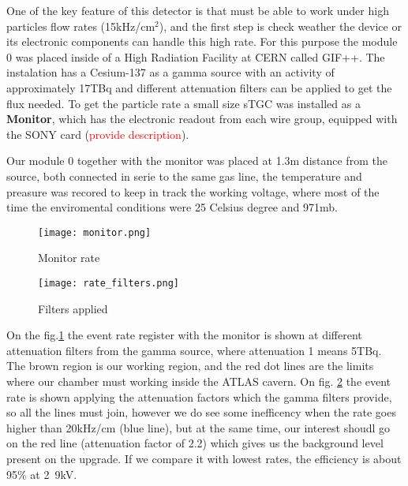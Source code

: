 One of the key feature of this detector is that must be able to work under high particles flow
rates (\unit{15}{kHz/cm$^2$}), and the first step is
check weather the device or its electronic components can handle this high rate. For this purpose the module 0 was
placed inside of a High Radiation Facility at CERN called GIF++.
The instalation has a Cesium-137 as a gamma source with an activity of approximately \unit{17}{TBq} and different attenuation
filters can be applied to get the flux needed. 
To get the particle rate a small size sTGC was installed as a {\bf Monitor}, which has the electronic readout from each
wire group, equipped with the SONY card (\textcolor{red}{provide description}).

Our module 0 together with the monitor was placed at 1.3m distance from the source, both connected in serie to the same
gas line, the temperature and preasure was recored to keep in track the working voltage, where most of the time the
enviromental conditions were 25 Celsius degree and \unit{971}{mb}.\\

\begin{figure}[!hb]
	\centering
	\texttt{[image: monitor.png]}
	\caption{Monitor rate}\label{fig:monrate}
\end{figure}


\begin{figure}[!ht]
	\centering
	\texttt{[image: rate\_filters.png]}
	\caption{Filters applied}\label{fig:filters}
\end{figure}
On the fig.\ref{fig:monrate} the event rate register with the monitor is shown at different attenuation filters from the
gamma source, where attenuation 1 means \unit{5}{TBq}. The
brown region is our working region, and the red dot lines are the limits where our chamber must working inside the ATLAS
cavern. On fig. \ref{fig:filters} the  event rate is shown applying the attenuation factors which the gamma filters
provide, so all the lines must join, however we do see some inefficency when the rate goes higher than \unit{20}{kHz/cm} (blue
line), but at the same time, our interest shoudl go on the red line (attenuation factor of 2.2) which gives us the
background level present on the upgrade. If we compare it with lowest rates, the efficiency is about 95\% at
\unit{2.9}{kV}.



